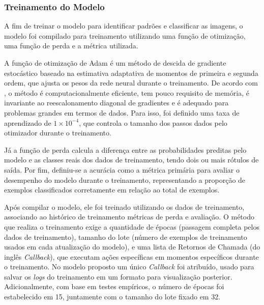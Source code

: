 
\subsubsection{\esp Treinamento do Modelo} \label{treinamento}

A fim de treinar o modelo para identificar padrões e classificar as imagens, o modelo foi compilado para treinamento utilizando uma função de otimização, uma função de perda e a métrica utilizada. 

A função de otimização de Adam é um método de descida de gradiente estocástico baseado na estimativa adaptativa de momentos de primeira e segunda ordem, que ajusta os pesos da rede neural durante o treinamento. De acordo com , o método é computacionalmente eficiente, tem pouco requisito de memória, é invariante ao reescalonamento diagonal de gradientes e é adequado para problemas grandes em termos de dados. Para isso, foi definido uma taxa de aprendizado de \ensuremath{1 \times 10^{-4}}, que controla o tamanho dos passos dados pelo otimizador durante o treinamento.

Já a função de perda calcula a diferença entre as probabilidades preditas pelo modelo e as classes reais dos dados de treinamento, tendo dois ou mais rótulos de saída. Por fim, definiu-se a acurácia como a métrica primária para avaliar o desempenho do modelo durante o treinamento, representando a proporção de exemplos classificados corretamente em relação ao total de exemplos. 

Após compilar o modelo, ele foi treinado utilizando os dados de treinamento, associando ao histórico de treinamento métricas de perda e avaliação. O método que realiza o treinamento exige a quantidade de épocas (passagem completa pelos dados de treinamento), tamanho do lote (número de exemplos de treinamento usados em cada atualização do modelo), e uma lista de Retornos de Chamada (do inglês \textit{Callback}), que executam ações específicas em momentos específicos durante o treinamento. No modelo proposto um único \textit{Callback} foi atribuído, usado para salvar os \textit{logs} do treinamento em um formato para visualização posterior. Adicionalmente, com base em testes empíricos, o número de épocas foi estabelecido em 15, juntamente com o tamanho do lote fixado em 32.



